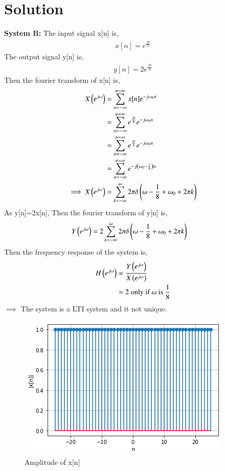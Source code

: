 \documentclass[journal,12pt,twocolumn]{IEEEtran}
\begin{document}
\section*{Solution}
\textbf{System B:}
The input signal x[n] is,
\begin{align}
    x[n]=e^{\frac{jn}{8}}\label{0}
\end{align}
The output signal y[n] is,
\begin{align}
    y[n]=2e^{\frac{jn}{8}}\label{1}
\end{align}
Then the fourier transform of x[n] is,
\begin{align}
    X\left(e^{j\omega}\right)&=\sum\limits_{n=-\infty}^{n=\infty}x[n]e^{-j\omega_{0} n}\\
    &=\sum\limits_{n=-\infty}^{n=\infty}e^{\frac{jn}{8}}e^{-j\omega_{0} n}\\
    &=\sum\limits_{n=-\infty}^{n=\infty}e^{\frac{jn}{8}}e^{-j\omega_{0} n}\\
    &=\sum\limits_{n=-\infty}^{n=\infty}e^{-j\left(\omega_{0}-\frac{1}{8}\right) n}\\
    \implies X\left(e^{j\omega}\right)&=\sum_{k=-\infty}^\omega2\pi \delta\left(\omega-\frac{1}{8}+\omega_{0}+2\pi k\right)
\end{align}
As y[n]=2x[n],
Then the fourier transform of y[n] is,
\begin{align}
    Y\left(e^{j\omega}\right)&=2 \sum_{k=-\infty}^\omega2\pi \delta\left(\omega-\frac{1}{8}+\omega_{0}+2\pi k\right)
\end{align}
Then the frequency response of the system is,
\begin{align}
    H\left(e^{j\omega}\right)&=\frac{Y\left(e^{j\omega}\right)}{X\left(e^{j\omega}\right)}\\
    &=2 \; \text{only if } \omega \text{ is } \frac{1}{8}
\end{align}
$\implies$ The system is a LTI system and it not unique.
\begin{figure}[!htp]
    \centering
    \includegraphics[width = \columnwidth]{1}
    \caption{Amplitude of x[n]}
    \label{f1}
\end{figure}
\end{document}
